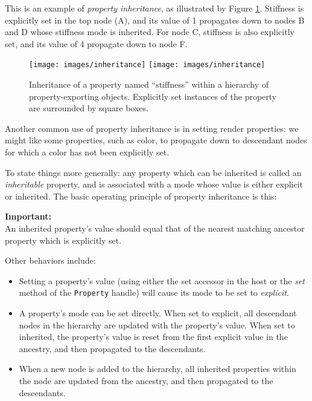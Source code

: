 This is an example of {\it property inheritance}, as illustrated by
Figure \ref{inheritFig}. Stiffness is explicitly set in the top node
(A), and its value of 1 propagates down to nodes B and D whose
stiffness mode is inherited. For node C, stiffness is also explicitly
set, and its value of 4 propagate down to node F.

\begin{figure}
\begin{center}
\iflatexml
\texttt{[image: images/inheritance]}
\else
\texttt{[image: images/inheritance]}
\fi
\end{center}
\caption{Inheritance of a property named ``stiffness'' within a
hierarchy of property-exporting objects. Explicitly set instances of
the property are surrounded by square boxes.}%
\label{inheritFig}
\end{figure}

Another common use of property inheritance is in setting render
properties: we might like some properties, such as color, to propagate
down to descendant nodes for which a color has not been explicitly
set.

To state things more generally: any property which can be inherited is
called an {\it inheritable} property, and is associated with a mode
whose value is either explicit or inherited. The basic operating
principle of property inheritance is this:

\begin{sideblock}
{\bf Important:}\\
An inherited property's value should equal that
of the nearest matching ancestor property which is explicitly set.
\end{sideblock}

Other behaviors include:

\begin{itemize}

\item Setting a property's value (using either the set accessor in the host
or the {\it set} method of the {\tt Property} handle) will cause its
mode to be set to {\it explicit}.

\item A property's mode can be set directly. When set to explicit, all
descendant nodes in the hierarchy are updated with the property's
value. When set to inherited, the property's value is reset from the
first explicit value in the ancestry, and then propagated to the
descendants.

\item When a new node is added to the hierarchy, all inherited properties
within the node are updated from the ancestry, and then propagated to
the descendants.

\end{itemize}


